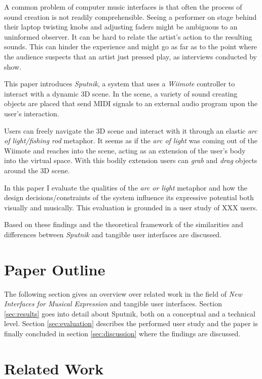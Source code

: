 \documentclass[10pt,a4paper]{scrartcl}
\begin{document}
A common problem of computer music interfaces is that often the process of sound creation is not readily comprehensible. Seeing a performer on stage behind their laptop twisting knobs and adjusting faders might be ambiguous to an uninformed observer. It can be hard to relate the artist's action to the resulting sounds. This can hinder the experience and might go as far as to the point where the audience suspects that an artist just pressed play, as interviews conducted by \cite{Pedersen2009} show.

This paper introduces \emph{Sputnik}, a system that uses a \emph{Wiimote} controller to interact with a dynamic 3D scene. In the scene, a variety of sound creating objects are placed that send MIDI signals to an external audio program upon the user's interaction. 

Users can freely navigate the 3D scene and interact with it through an elastic \emph{arc of light/fishing rod} metaphor. It seems as if the \emph{arc of light} was coming out of the Wiimote and reaches into the scene, acting as an extension of the user's body into the virtual space. With this bodily extension users can \emph{grab} and \emph{drag} objects around the 3D scene.



In this paper I evaluate the qualities of the \emph{arc or light} metaphor and how the design decisions/constraints of the system influence its expressive potential both visually and musically. This evaluation is grounded in a user study of XXX users.

Based on these findings and the theoretical framework of \cite{Ullmer2000} the similarities and differences between \emph{Sputnik} and tangible user interfaces are discussed. 


\section{Paper Outline}
The following section gives an overview over related work in the field of \emph{New Interfaces for Musical Expression} and tangible user interfaces. Section \ref{sec:results} goes into detail about Sputnik, both on a conceptual and a technical level. Section \ref{sec:evaluation} describes the performed user study and the paper is finally concluded in section \ref{sec:discussion} where the findings are discussed.


\section{Related Work}
\end{document}
